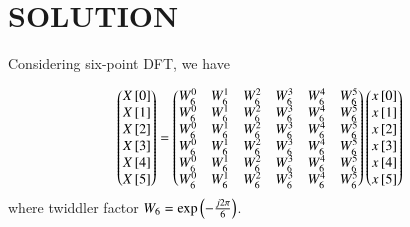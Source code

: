 \documentclass[journal,12pt,twocolumn]{IEEEtran}
\begin{document}
\section*{SOLUTION}
Considering six-point DFT, we have 

\begin{align}
\label{eq:1}
\begin{pmatrix}X{}\left[0\right]\\X{}\left[1\right]\\X{}\left[2\right]\\X{}\left[3\right]\\X{}\left[4\right]\\X{}\left[5\right]\end{pmatrix} = \begin{pmatrix}W_{6}^{0}&W_{6}^{1}&W_{6}^{2}&W_{6}^{3}&W_{6}^{4}&W_{6}^{5}\\W_{6}^{0}&W_{6}^{1}&W_{6}^{2}&W_{6}^{3}&W_{6}^{4}&W_{6}^{5}\\W_{6}^{0}&W_{6}^{1}&W_{6}^{2}&W_{6}^{3}&W_{6}^{4}&W_{6}^{5}\\W_{6}^{0}&W_{6}^{1}&W_{6}^{2}&W_{6}^{3}&W_{6}^{4}&W_{6}^{5}\\W_{6}^{0}&W_{6}^{1}&W_{6}^{2}&W_{6}^{3}&W_{6}^{4}&W_{6}^{5}\\W_{6}^{0}&W_{6}^{1}&W_{6}^{2}&W_{6}^{3}&W_{6}^{4}&W_{6}^{5}\end{pmatrix}\begin{pmatrix}x{}\left[0\right]\\x{}\left[1\right]\\x{}\left[2\right]\\x{}\left[3\right]\\x{}\left[4\right]\\x{}\left[5\right]\end{pmatrix}
\end{align}
where twiddler factor $W_{6} = \text{exp}\left(-\frac{j2\pi}{6}\right)$.
\end{document}
